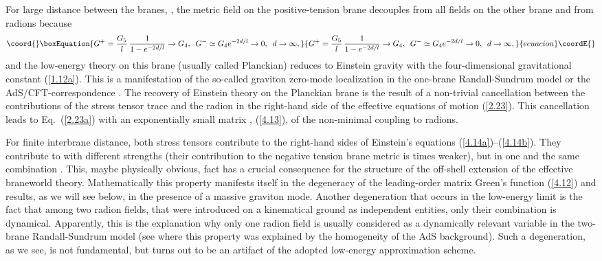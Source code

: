 \documentclass[a4paper,preprint,nofootinbib,
                 showpacs,preprintnumbers,amsmath,amssymb]{revtex4}
\begin{document}
For large distance between the branes, \coordHE{}, the metric field 
on the positive-tension brane decouples from all fields on the 
other brane and from radions because 
    \begin{equation}\coord{}\boxEquation{ 
    G^+=\frac{G_5}l\, 
    \frac1{1-e^{-2d/l}}\to G_4,\,\,\, 
    G^-\simeq G_4e^{-2d/l}\to 0,\,\,\,d\to\infty,  \label{4.16} 
    }{ 
    G^+=\frac{G_5}l\, 
    \frac1{1-e^{-2d/l}}\to G_4,\,\,\, 
    G^-\simeq G_4e^{-2d/l}\to 0,\,\,\,d\to\infty,  }{ecuacion}\coordE{}\end{equation} 
and the low-energy theory on this brane (usually called Planckian)  
reduces to Einstein 
gravity with the four-dimensional gravitational constant 
(\ref{1.12a}). This is a manifestation of the so-called graviton 
zero-mode localization in the one-brane Randall-Sundrum model 
\cite{RSloc} or the AdS/CFT-correspondence \cite{Gubser,HHR1,HHR2}. 
The recovery of Einstein theory on the Planckian brane is 
the result of a non-trivial cancellation between the contributions 
of the stress tensor trace and the radion in the right-hand side 
of the effective equations of motion (\ref{2.23}). This cancellation 
leads to Eq.~(\ref{2.23a}) with an exponentially small matrix 
\coordHE{}, (\ref{4.13}), of the non-minimal 
coupling to radions. 
 
For finite interbrane distance, both stress tensors 
\coordHE{} contribute to the right-hand sides of Einstein's 
equations (\ref{4.14a})--(\ref{4.14b}). They contribute to 
\coordHE{} with different strengths (their contribution to the 
negative tension brane metric is \coordHE{} times weaker), but in 
one and the same combination \coordHE{}. 
This, maybe physically obvious, fact has a crucial consequence for 
the structure of the off-shell extension of the effective 
braneworld theory. Mathematically this property manifests itself 
in the degeneracy of the leading-order matrix Green's function 
(\ref{4.12}) and results, as we will see below, in the presence of 
a massive graviton mode. Another degeneration that occurs in the 
low-energy limit is the fact that among 
two radion fields, that were introduced on a kinematical ground as 
independent entities, only their combination \myHighlight{$(\xi^+-\xi^-)$}\coordHE{} is 
dynamical. Apparently, this is the explanation why only one radion 
field is usually considered as a dynamically relevant variable in 
the two-brane Randall-Sundrum model (see \cite{GarPujTan} where 
this property was explained by the homogeneity of the AdS background). 
Such a degeneration, as we see, is not fundamental, but turns out 
to be an artifact of the adopted low-energy approximation scheme. 
 
\end{document}
